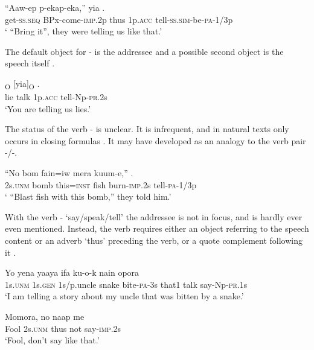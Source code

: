 \ea%
\label{ex:3:x315}
\gll ``Aaw-ep p-ekap-eka,''  yia .\\
get-\textsc{ss}.\textsc{seq} BPx-come-\textsc{imp}.2p thus 1p.\textsc{acc} tell-\textsc{ss}.\textsc{sim}-be-\textsc{pa}-1/3p\\
\glt` ``Bring it'', they were telling us like that.'
\z

The default object for - is the addressee  and a possible second object is the speech itself .

\ea%
\label{ex:3:x316}
\textsubscript{O} [yia]\textsubscript{O} . \\
lie talk 1p.\textsc{acc} tell-Np-\textsc{pr}.2s \\
\glt`You are telling us lies.'
\z

The status of the verb - is unclear. It is infrequent, and in natural texts only occurs in closing formulas . It may have developed as an analogy to the verb pair -/-.

\ea%
\label{ex:3:x317}
\gll ``No bom fain=iw mera kuum-e,'' . \\
2s.\textsc{unm} bomb this=\textsc{inst} fish burn-\textsc{imp}.2s tell-\textsc{pa}-1/3p \\
\glt` ``Blast fish with this bomb,'' they told him.'
\z

With the verb - `say/speak/tell' the addressee is not in focus, and is hardly ever even mentioned. Instead, the verb requires either an object referring to the speech content  or an adverb  `thus'  preceding the verb, or a quote complement following it . 

\ea%
\label{ex:3:x318}
\gll Yo yena yaaya ifa ku-o-k nain opora \\
1s.\textsc{unm} 1s.\textsc{gen} 1s/p.uncle snake bite-\textsc{pa}-3s that1 talk say-Np-\textsc{pr}.1s\\
\glt`I am telling a story about my uncle that was bitten by a snake.'
\z

\ea%
\label{ex:3:x319}
\gll Momora, no naap me  \\
Fool 2s.\textsc{unm} thus not say-\textsc{imp}.2s \\
\glt`Fool, don't say like that.'
\z

